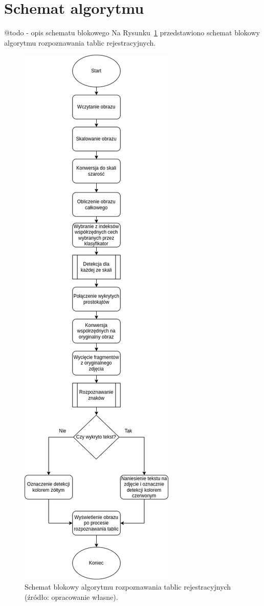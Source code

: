 \section{Schemat algorytmu}
@todo - opis schematu blokowego
Na Rysunku~\ref{fig:main_alg} przedstawiono schemat blokowy algorytmu rozpoznawania tablic rejestracyjnych.
\begin{figure}[!ht]
    \centering
    \includegraphics[scale=0.4]{Pictures/main_alg}
    \caption{Schemat blokowy algorytmu rozpoznawania tablic rejestracyjnych (źródło: opracowanie własne).}
    \label{fig:main_alg}
\end{figure}
\FloatBarrier

